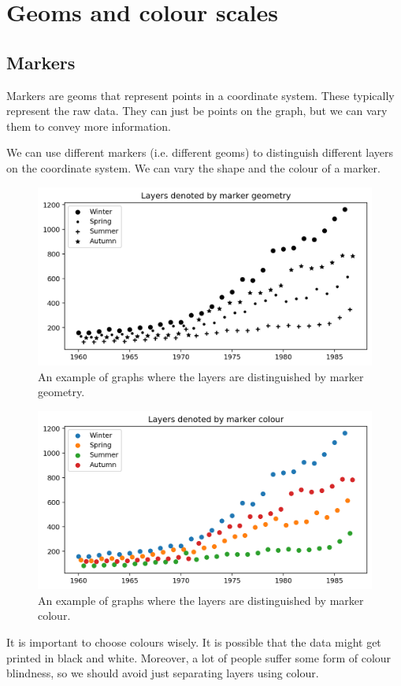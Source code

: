 \documentclass[a4paper, openany]{memoir}
\begin{document}
\section{Geoms and colour scales}
\subsection{Markers}
Markers are geoms that represent points in a coordinate system. These typically represent the raw data. They can just be points on the graph, but we can vary them to convey more information.

We can use different markers (i.e. different geoms) to distinguish different layers on the coordinate system. We can vary the shape and the colour of a marker.
\begin{figure}[H]
    \centering
    \includegraphics[scale=0.6]{src/2.38 Gas Example Plot 22.png}
    \caption{An example of graphs where the layers are distinguished by marker geometry.}
\end{figure}
\begin{figure}[H]
    \centering
    \includegraphics[scale=0.6]{src/2.39 Gas Example Plot 23.png}
    \caption{An example of graphs where the layers are distinguished by marker colour.}
\end{figure}
It is important to choose colours wisely. It is possible that the data might get printed in black and white. Moreover, a lot of people suffer some form of colour blindness, so we should avoid just separating layers using colour.
\end{document}
